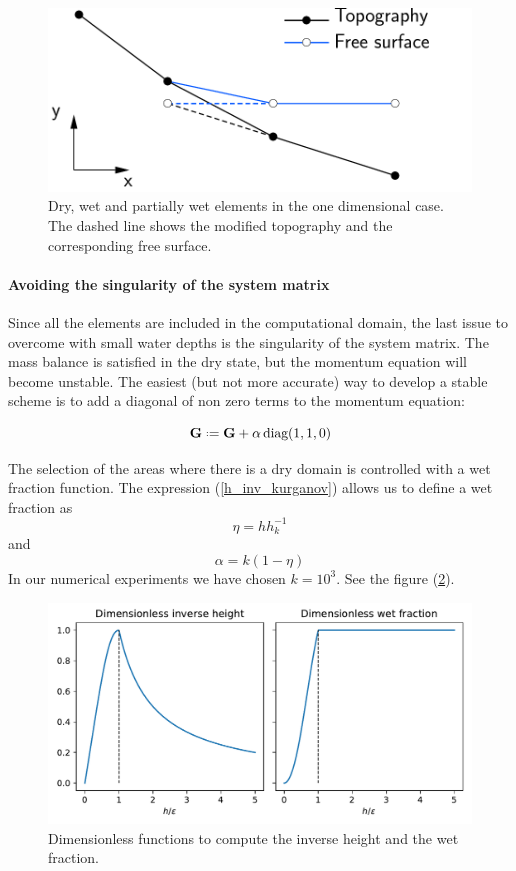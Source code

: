 \documentclass[a4paper,12pt]{article}
\newcommand{\defeq}{\mathrel{\vcenter{\baselineskip0.5ex\lineskiplimit0pt\hbox{\scriptsize.}\hbox{\scriptsize.}}}=}
\begin{document}
\begin{figure}
    \centering
    \includegraphics[width=.5\textwidth]{img/fig/partially_dry.pdf}
    \caption{Dry, wet and partially wet elements in the one dimensional case. The dashed line shows the modified topography  and the corresponding free surface.}
    \label{partially_dry}
\end{figure}

\paragraph{Avoiding the singularity of the system matrix}
Since all the elements are included in the computational domain, the last issue to overcome with small water depths is the singularity of the system matrix. The mass balance is satisfied in the dry state, but the momentum equation will become unstable. The easiest (but not more accurate) way to develop a stable scheme is to add a diagonal of non zero terms to the momentum equation:

\begin{equation}
\mathbf{G} \defeq \mathbf{G} + \alpha\,\text{diag}(1, 1, 0)
\end{equation}

The selection of the areas where there is a dry domain is controlled with a wet fraction function. The expression (\ref{h_inv_kurganov}) allows us to define a wet fraction as
\begin{equation}
\eta = hh^{-1}_k
\end{equation}
and
\begin{equation}
\alpha = k(1-\eta)
\end{equation}
In our numerical experiments we have chosen $k=10^3$. See the figure (\ref{inverse_heihgt}).

\begin{figure}
    \centering
    \includegraphics[width=\textwidth]{img/fig/inverse_height.pdf}
    \caption{Dimensionless functions to compute the  inverse height and the wet fraction.}
    \label{inverse_heihgt}
\end{figure}
\end{document}
